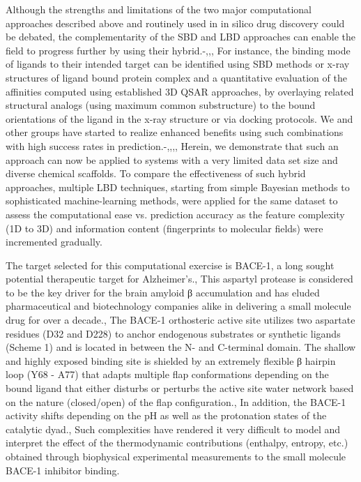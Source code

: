 Although the strengths and limitations of the two major computational approaches described above and routinely used in in silico drug discovery could be debated, the complementarity of the SBD and LBD approaches can enable the field to progress further by using their hybrid.-,,,  For instance, the binding mode of ligands to their intended target can be identified using SBD methods or x-ray structures of ligand bound protein complex and a quantitative evaluation of the affinities computed using established 3D QSAR approaches, by overlaying related structural analogs (using maximum common substructure) to the bound orientations of the ligand in the x-ray structure or via docking protocols.  We and other groups have started to realize enhanced benefits using such combinations with high success rates in prediction.-,,,,  Herein, we demonstrate that such an approach can now be applied to systems with a very limited data set size and diverse chemical scaffolds.   To compare the effectiveness of such hybrid approaches, multiple LBD techniques, starting from simple Bayesian methods to sophisticated machine-learning methods, were applied for the same dataset to assess the computational ease vs. prediction accuracy as the feature complexity (1D to 3D) and information content (fingerprints to molecular fields) were incremented gradually.

The target selected for this computational exercise is BACE-1, a long sought potential therapeutic target for Alzheimer’s.,  This aspartyl protease is considered to be the key driver for the brain amyloid β accumulation and has eluded pharmaceutical and biotechnology companies alike in delivering a small molecule drug for over a decade.,  The BACE-1 orthosteric active site utilizes two aspartate residues (D32 and D228) to anchor endogenous substrates or synthetic ligands (Scheme 1) and is located in between the N- and C-terminal domain.  The shallow and highly exposed binding site is shielded by an extremely flexible β hairpin loop (Y68 - A77) that adapts multiple flap conformations depending on the bound ligand that either disturbs or perturbs the active site water network based on the nature (closed/open) of the flap configuration.,  In addition, the BACE-1 activity shifts depending on the pH as well as the protonation states of the catalytic dyad.,  Such complexities have rendered it very difficult to model and interpret the effect of the thermodynamic contributions (enthalpy, entropy, etc.) obtained through biophysical experimental measurements to the small molecule BACE-1 inhibitor binding.  

